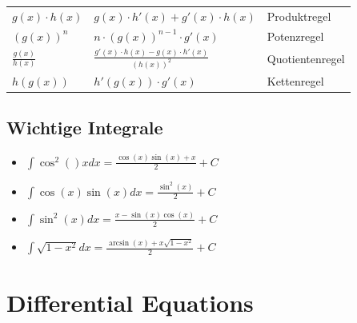 \documentclass[25pt]{sciposter}
\begin{document}
\begin{multicols}{3}
{\begin{table}[]
\begin{tabular}{@{} p{} p{} p{} @{}}
			\midrule
			$g(x) \cdot h(x)$ & $g(x) \cdot h'(x) + g'(x) \cdot h(x)$ & Produktregel\\
			$\left(g(x)\right)^n$ & $n \cdot \left( g(x) \right)^{n-1} \cdot g'(x)$ & Potenzregel\\
			$\frac{g(x)}{h(x)}$ & $\frac{ g'(x) \cdot h(x) - g(x)\cdot h'(x)}{\left(h(x)\right) ^2}$ & Quotientenregel\\
			$h(g(x))$ & $h'(g(x)) \cdot g'(x)$ & Kettenregel\\
			\bottomrule
		\end{tabular}
	\end{table}
}



\subsection*{Wichtige Integrale}

\begin{itemize}
	\item $\int \cos^2()x dx = \frac{\cos(x)\sin(x) + x}{2} + C$
	\item $\int \cos(x) \sin(x) dx = \frac{\sin^2(x)}{2}+C $
	\item $\int \sin^2(x) dx = \frac{x - \sin(x)\cos(x)}{2} + C$
	\item $\int \sqrt{1-x^2} dx = \frac{\arcsin(x) + x \sqrt{1-x^2}}{2} + C$
\end{itemize}












\section{Differential Equations}











\end{multicols}
\end{document}
